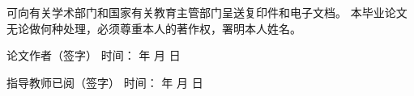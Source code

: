 {{\begin{spacing}{2.0}
{        可向有关学术部门和国家有关教育主管部门呈送复印件和电子文档。
        本毕业论文无论做何种处理，必须尊重本人的著作权，署明本人姓名。}
        \end{spacing}
        \vspace{1em}
        \begin{center}
            {\songti {}论文作者\underline{\makebox[8em][c]{}}（签字） \quad
            时间：
            \makebox[3em][c]{} 年
            \makebox[1.5em][c]{} 月
            \makebox[1.5em][c]{} 日} \par
            \vspace{1em}
            {\songti {}指导教师已阅\underline{\makebox[6em][c]{}}（签字） \quad
            时间：
            \makebox[3em][c]{} 年
            \makebox[1.5em][c]{} 月
            \makebox[1.5em][c]{} 日}
        \end{center}
    }
}